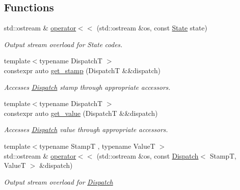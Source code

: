 \subsection*{Functions}
\begin{DoxyCompactItemize}
\item 
std\+::ostream \& \hyperlink{namespaceflow_add94bf5b887f5f969dd2988fdf0673d9}{operator$<$$<$} (std\+::ostream \&os, const \hyperlink{namespaceflow_adefe9726e597eb50c46f0f6a202018e9}{State} state)
\begin{DoxyCompactList}\small\item\em Output stream overload for {\ttfamily State} codes. \end{DoxyCompactList}\item 
\mbox{\label{namespaceflow_a7e74f2c2aa617c702eb0b184658b3e2e}} 
{\footnotesize template$<$typename DispatchT $>$ }\\constexpr auto \hyperlink{namespaceflow_a7e74f2c2aa617c702eb0b184658b3e2e}{get\+\_\+stamp} (DispatchT \&\&dispatch)
\begin{DoxyCompactList}\small\item\em Accesses \hyperlink{classflow_1_1_dispatch}{Dispatch} stamp through appropriate accessors. \end{DoxyCompactList}\item 
\mbox{\label{namespaceflow_ae6b46b0890787880f9cb14596a3c3be5}} 
{\footnotesize template$<$typename DispatchT $>$ }\\constexpr auto \hyperlink{namespaceflow_ae6b46b0890787880f9cb14596a3c3be5}{get\+\_\+value} (DispatchT \&\&dispatch)
\begin{DoxyCompactList}\small\item\em Accesses \hyperlink{classflow_1_1_dispatch}{Dispatch} value through appropriate accessors. \end{DoxyCompactList}\item 
{\footnotesize template$<$typename StampT , typename ValueT $>$ }\\std\+::ostream \& \hyperlink{namespaceflow_ae7e587a04ccd87fa5982d609473c6f96}{operator$<$$<$} (std\+::ostream \&os, const \hyperlink{classflow_1_1_dispatch}{Dispatch}$<$ StampT, ValueT $>$ \&dispatch)
\begin{DoxyCompactList}\small\item\em Output stream overload for {\ttfamily \hyperlink{classflow_1_1_dispatch}{Dispatch}} \end{DoxyCompactList}\item 

\end{DoxyCompactItemize}
